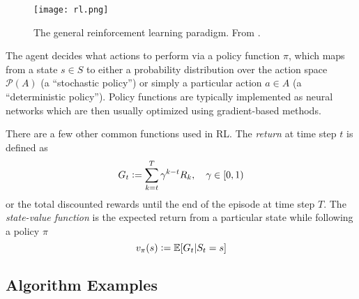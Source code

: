 \begin{figure}[H]
    \centering
    \texttt{[image: rl.png]}
    \caption{The general reinforcement learning paradigm. From \cite{sutton2018reinforcement}.}
    \label{fig:RL}
\end{figure}

The agent decides what actions to perform via a policy function $\pi$, which maps from a state $s \in S$ to either a probability distribution over the action space $\mathcal{P}(A)$ (a ``stochastic policy'') or simply a particular action $a \in A$ (a ``deterministic policy''). Policy functions are typically implemented as neural networks which are then usually optimized using gradient-based methods.

There are a few other common functions used in RL. The \emph{return} at time step $t$ is defined as
\begin{equation}\label{eq:return}
    G_t \mathrel{\mathop:}= \sum_{k=t}^T \gamma^{k-t} R_k, \quad \gamma \in [0,1)
\end{equation}
or the total discounted rewards until the end of the episode at time step $T$. The \emph{state-value function} is the expected return from a particular state while following a policy $\pi$
\begin{equation}\label{eq:state_value}
    v_\pi(s) \mathrel{\mathop:}= \mathbb E[G_t | S_t = s]
\end{equation}







\subsection{Algorithm Examples}

